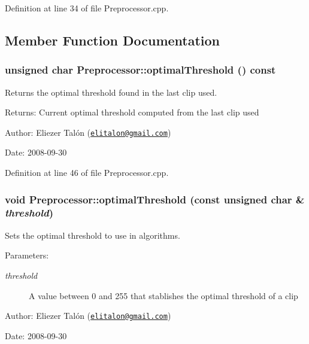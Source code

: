 Definition at line 34 of file Preprocessor.cpp.

\subsection{Member Function Documentation}
\hypertarget{class_preprocessor_1d8eaa1cf786941dbfa1eca95b46ce0c}{
\subsubsection[optimalThreshold]{\setlength{\rightskip}{0pt plus 5cm}unsigned char Preprocessor::optimalThreshold () const}}
\label{class_preprocessor_1d8eaa1cf786941dbfa1eca95b46ce0c}


Returns the optimal threshold found in the last clip used. 

\begin{Desc}
\item[Returns:]Current optimal threshold computed from the last clip used\end{Desc}
\begin{Desc}
\item[Author:]Eliezer Talón (\href{mailto:elitalon@gmail.com}{\tt elitalon@gmail.com}) \end{Desc}
\begin{Desc}
\item[Date:]2008-09-30 \end{Desc}


Definition at line 46 of file Preprocessor.cpp.\hypertarget{class_preprocessor_1fc44d7d19944f3c3addd3a576c37414}{
\subsubsection[optimalThreshold]{\setlength{\rightskip}{0pt plus 5cm}void Preprocessor::optimalThreshold (const unsigned char \& {\em threshold})}}
\label{class_preprocessor_1fc44d7d19944f3c3addd3a576c37414}


Sets the optimal threshold to use in algorithms. 

\begin{Desc}
\item[Parameters:]
\begin{description}
\item[{\em threshold}]A value between 0 and 255 that stablishes the optimal threshold of a clip\end{description}
\end{Desc}
\begin{Desc}
\item[Author:]Eliezer Talón (\href{mailto:elitalon@gmail.com}{\tt elitalon@gmail.com}) \end{Desc}
\begin{Desc}
\item[Date:]2008-09-30 \end{Desc}


